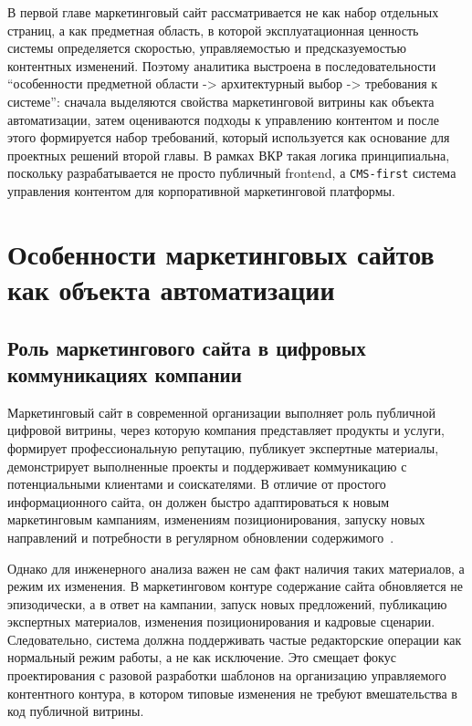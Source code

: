 В первой главе маркетинговый сайт рассматривается не как набор отдельных страниц, а как
предметная область, в которой эксплуатационная ценность системы определяется скоростью,
управляемостью и предсказуемостью контентных изменений. Поэтому аналитика выстроена в
последовательности ``особенности предметной области -> архитектурный выбор -> требования
к системе'': сначала выделяются свойства маркетинговой витрины как объекта автоматизации,
затем оцениваются подходы к управлению контентом и после этого формируется набор
требований, который используется как основание для проектных решений второй главы. В
рамках ВКР такая логика принципиальна, поскольку разрабатывается не просто публичный
frontend, а \texttt{CMS-first} система управления контентом для корпоративной
маркетинговой платформы.

\section{Особенности маркетинговых сайтов как объекта автоматизации}

\subsection{Роль маркетингового сайта в цифровых коммуникациях компании}

Маркетинговый сайт в современной организации выполняет роль публичной цифровой витрины,
через которую компания представляет продукты и услуги, формирует профессиональную
репутацию, публикует экспертные материалы, демонстрирует выполненные проекты и поддерживает
коммуникацию с потенциальными клиентами и соискателями. В отличие от простого
информационного сайта, он должен быстро адаптироваться к новым маркетинговым кампаниям,
изменениям позиционирования, запуску новых направлений и потребности в регулярном
обновлении содержимого~\cite{torgunakova2023marketing-website,voroniuk2020retail-cms-needs}.

Однако для инженерного анализа важен не сам факт наличия таких материалов, а режим их
изменения. В маркетинговом контуре содержание сайта обновляется не эпизодически, а в
ответ на кампании, запуск новых предложений, публикацию экспертных материалов, изменения
позиционирования и кадровые сценарии. Следовательно, система должна поддерживать частые
редакторские операции как нормальный режим работы, а не как исключение. Это смещает
фокус проектирования с разовой разработки шаблонов на организацию управляемого
контентного контура, в котором типовые изменения не требуют вмешательства в код
публичной витрины.


